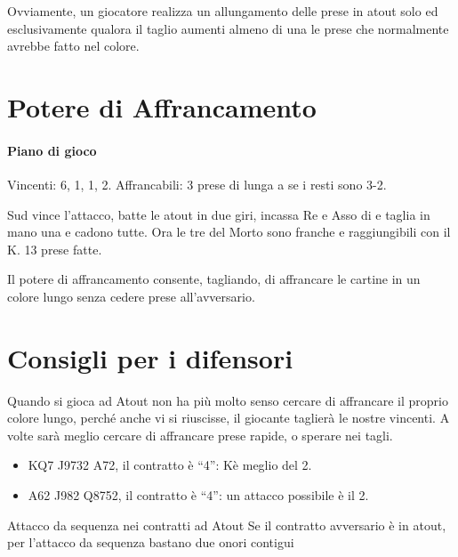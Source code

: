 \documentclass[../corsofiori.tex]{subfiles}
\begin{document}
Ovviamente, un giocatore realizza un allungamento delle prese in atout solo ed esclusivamente qualora il taglio aumenti
almeno di una le prese che normalmente avrebbe fatto nel colore.

\section{Potere di Affrancamento}

\newgame
{}
\leftupper{\boardtext*}%
{\dealertext\quad}{\vulnertext}

\showAll*

\paragraph{Piano di gioco} Vincenti: 6\Sp, 1\He, 1\Di, 2\Cl. Affrancabili: 3 prese di lunga a \fio se i resti sono 3-2.

Sud vince l'attacco, batte le atout in due giri, incassa Re e Asso di \fio e taglia in mano una \fio e cadono tutte. Ora
le tre \fio del Morto sono franche e raggiungibili con il K\He. 13 prese fatte.

Il potere di affrancamento consente, tagliando, di affrancare le cartine in un colore lungo senza cedere prese
all'avversario.

\section{Consigli per i difensori}

Quando si gioca ad Atout non ha più molto senso cercare di affrancare il proprio colore lungo, perché anche vi si
riuscisse, il giocante taglierà le nostre vincenti. A volte sarà meglio cercare di affrancare prese rapide, o sperare
nei tagli.
\begin{itemize}
    \item \Sp KQ7  \Di J9732 \Cl A72, il contratto è “4\He”: K\Sp è meglio del 2\Di.
    \item {} \He A62 \Di J982 \Cl Q8752, il contratto è “4\He”: un attacco possibile è il 2\Sp.
\end{itemize}

\begin{regola}{Attacco da sequenza nei contratti ad Atout}
    Se il contratto avversario è in atout, per l'attacco da sequenza bastano due onori contigui
\end{regola}
\end{document}
